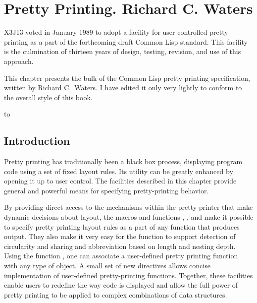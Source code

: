 

\clearpage\def\pagestatus{FINAL PROOF}

\chapter{Pretty Printing. Richard C. Waters}
\label{PPRINT}

\prefaceword
\begin{new}
X3J13 voted in January 1989
to adopt a facility for user-controlled pretty printing
as a part of the forthcoming draft Common Lisp standard.
This facility is the culmination of thirteen
years of design, testing, revision, and use of this approach.
\end{new}
This chapter presents the bulk of the Common Lisp
pretty printing specification, written by Richard C.~Waters.  I have
edited it only very lightly
to conform to the overall style of this book.

\noindent\hbox to \textwidth{\hss---Guy L. Steele Jr.}

\section{Introduction}

Pretty printing has traditionally been a black box process, displaying
program code using a set of fixed layout rules.  Its utility can be greatly
enhanced by opening it up to user control.  The facilities described
in this chapter provide general and powerful means for specifying pretty-printing
behavior.

By providing direct access to the mechanisms within the pretty printer that
make dynamic decisions about layout, the macros and functions
, , and  make
it possible to specify pretty printing layout rules as a part of any
function that produces output.  They also make it very easy for the
function to support
detection of circularity and sharing and abbreviation based on length and
nesting depth.  Using the function
, one can associate a user-defined pretty
printing function with any type of object.  A small set of new 
directives allows concise implementation of user-defined pretty-printing
functions.
Together, these facilities
enable users to redefine the way code is displayed and allow the full power
of pretty printing to be applied to complex combinations of data
structures.

